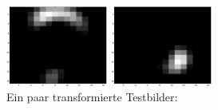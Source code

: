\documentclass{article}
\begin{document}
\includegraphics[width=0.25\textwidth]{codebook19.eps}\hspace{0.03\textwidth}%
\includegraphics[width=0.25\textwidth]{codebook20.eps}\\[4em]
\newpage
Ein paar transformierte Testbilder:\\
\end{document}
